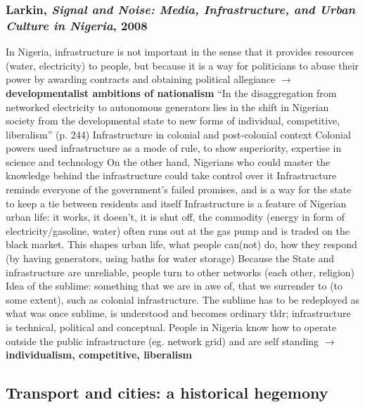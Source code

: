 \documentclass{article}
\begin{document}
\begin{outline}
	\1 
\end{outline}

\subsubsection{Larkin, \textit{Signal and Noise: Media, Infrastructure, and Urban Culture in Nigeria}, 2008}

\begin{outline}
	\1 In Nigeria, infrastructure is not important in the sense that it provides resources (water, electricity) to people, but because it is a way for politicians to abuse their power by awarding contracts and obtaining political allegiance $\rightarrow$ \textbf{developmentalist ambitions of nationalism}
	\1 ``In the disaggregation from networked electricity to autonomous generators lies in the shift in Nigerian society from the developmental state to new forms of individual, competitive, liberalism'' (p. 244)
	\1 Infrastructure in colonial and post-colonial context
		\2 Colonial powers used infrastructure as a mode of rule, to show superiority, expertise in science and technology
		\2 On the other hand, Nigerians who could master the knowledge behind the infrastructure could take control over it 
		\2 Infrastructure reminds everyone of the government's failed promises, and is a way for the state to keep a tie between residents and itself
	\1 Infrastructure is a feature of Nigerian urban life: it works, it doesn't, it is shut off, the commodity (energy in form of electricity/gasoline, water) often runs out at the gas pump and is traded on the black market. This shapes urban life, what people can(not) do, how they respond (by having generators, using baths for water storage)
	\1 Because the State and infrastructure are unreliable, people turn to other networks (each other, religion)
	\1 Idea of the sublime: something that we are in awe of, that we surrender to (to some extent), such as colonial infrastructure. The sublime has to be redeployed as what was once sublime, is understood and becomes ordinary
	\1 tldr; infrastructure is technical, political and conceptual. People in Nigeria know how to operate outside the public infrastructure (eg. network grid) and are self standing $\rightarrow$ \textbf{individualism, competitive, liberalism}
\end{outline}

\subsection{Transport and cities: a historical hegemony}
\end{document}
